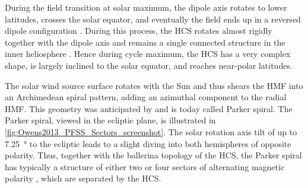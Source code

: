 During the field transition at solar maximum, the dipole axis rotates to lower latitudes, crosses the solar equator, and eventually the field ends up in a reversed dipole configuration \citep{Jones2003}. During this process, the HCS rotates almost rigidly together with the dipole axis and remains a single connected structure in the inner heliosphere \citep{Jones2003}. Hence during cycle maximum, the HCS has a very complex shape, is largely inclined to the solar equator, and reaches near-polar latitudes.

The solar wind source surface rotates with the Sun and thus shears the HMF into an Archimedean spiral pattern, adding an azimuthal component to the radial HMF. This geometry was anticipated by \citet{Parker1958} and is today called Parker spiral. The Parker spiral, viewed in the ecliptic plane, is illustrated in \autoref{fig:Owens2013_PFSS_Sectors_screenshot}. The solar rotation axis tilt of up to \SI{7.25}{\degree} to the ecliptic leads to a slight diving into both hemispheres of opposite polarity. Thus, together with the ballerina topology of the HCS, the Parker spiral has typically a structure of either two or four sectors of alternating magnetic polarity \citep{Ness1965}, which are separated by the HCS.
\begin{figure}[htb]
\end{figure}

